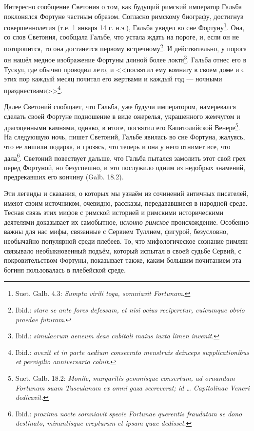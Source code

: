 Интересно сообщение Светония о том, как будущий римский император Гальба поклонялся Фортуне частным образом. Согласно римскому биографу, достигнув совершеннолетия (т.е. 1 января 14 г. н.э.), Гальба увидел во сне Фортуну\footnote{Suet. Galb. 4.3: \textit{Sumpta virili toga, somniavit Fortunam}.}. Она, со слов Светония, сообщала Гальбе, что устала ждать на пороге, и, если он не поторопится, то она достанется первому встречному\footnote{Ibid.: \textit{stare se ante fores defessam, et nisi ocius reciperetur, cuicumque obvio praedae futuram}.}. И действительно, у порога он нашёл медное изображение Фортуны длиной более локтя\footnote{Ibid.: \textit{simulacrum aeneum deae cubitali maius iuxta limen invenit}.}. Гальба отнес его в Тускул, где обычно проводил лето, и <<посвятил ему комнату в своем доме и с этих пор каждый месяц почитал его жертвами и каждый год — ночными празднествами>>\footnote{Ibid.: \textit{avexit et in parte aedium consecrato menstruis deinceps supplicationibus et pervigilio anniversario coluit}.}.

Далее Светоний сообщает, что Гальба, уже будучи императором, намеревался сделать своей Фортуне подношение в виде ожерелья, украшенного жемчугом и драгоценными камнями, однако, в итоге, посвятил его Капитолийской Венере\footnote{Suet. Galb. 18.2: \textit{Monile, margaritis gemmisque consertum, ad ornandam Fortunam suam Tusculanam ex omni gaza secreverat; id \ldots{} Capitolinae Veneri dedicavit}.}. На следующую ночь, пишет Светоний, Гальбе явилась во сне Фортуна, жалуясь, что ее лишили подарка, и грозясь, что теперь и она у него отнимет все, что дала\footnote{Ibid.: \textit{proxima nocte somniavit specie Fortunae querentis fraudatam se dono destinato, minantisque erepturam et ipsam quae dedisset}.}. Светоний повествует дальше, что Гальба пытался замолить этот свой грех перед Фортуной, но безуспешно, и это послужило одним из недобрых знамений, предрекавших его кончину (Galb. 18.2).

Эти легенды и сказания, о которых мы узнаём из сочинений античных писателей, имеют своим источником, очевидно, рассказы, передававшиеся в народной среде. Тесная связь этих мифов с римской историей и римскими историческими деятелями доказывает их самобытное, \textit{исконно римское} происхождение. Особенно важны для нас мифы, связанные с Сервием Туллием, фигурой, безусловно, необычайно популярной среди плебеев. То, что мифологическое сознание римлян связывало необыкновенный подъём, который испытал в своей судьбе Сервий, с покровительством Фортуны, показывает также, каким большим почитанием эта богиня пользовалась в плебейской среде.

